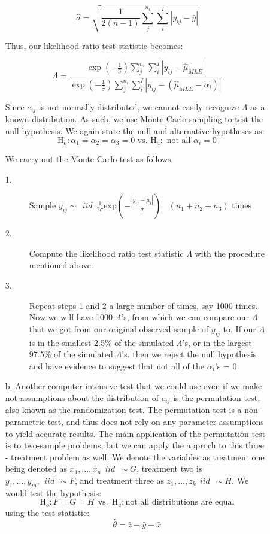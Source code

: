 \documentclass[12pt]{article}
\begin{document}
\begin{description}
\begin{itemize}
\[\hat{\sigma} = \sqrt{\frac{1}{2(n-1)}\sum_j^{n_i}\sum_i^{I} |y_{ij} - \bar{y}|} \]

Thus, our likelihood-ratio test-statistic becomes:

\[\Lambda = \frac{\exp(-\frac{1}{\hat{\sigma}})\sum_j^{n_i}\sum_i^{I}|y_{ij} - \hat{\mu}_{MLE}|}{\exp(-\frac{1}{\hat{\sigma}})\sum_j^{n_i}\sum_i^{I}|y_{ij} - (\hat{\mu}_{MLE}-\alpha_i)|} \]

Since $e_{ij}$ is not normally distributed, we cannot easily recognize $\Lambda$ as a known distribution. As such, we use Monte Carlo sampling to test the null hypothesis. We again state the null and alternative hypotheses as:
\[\text{H}_o: \alpha_1 = \alpha_2 = \alpha_3 = 0 \text{ vs. } \text{H}_a: \text{ not all } \alpha_i = 0\]

We carry out the Monte Carlo test as follows:

\begin{description}
\item[1.] Sample $  y_{ij} \sim \ \ iid \ \ \frac{1}{2\sigma} \mathrm{exp} \left( -\frac{|y_{ij} - \mu_i|}{\sigma}\right) \ \ \ \ (n_1 + n_2 + n_3) \text{ times}$
\item[2.] Compute the likelihood ratio test statistic $\Lambda$ with the procedure mentioned above. 
\item[3.] Repeat steps 1 and 2 a large number of times, say 1000 times.\\

Now we will have 1000 $\Lambda$'s, from which we can compare our $\Lambda$ that we got from our original observed sample of $y_{ij}$ to. If our $\Lambda$ is in the smallest 2.5\% of the simulated $\Lambda$'s, or in the largest  97.5\% of the simulated $\Lambda$'s, then we reject the null hypothesis and have evidence to suggest that not all of the $\alpha_i$'s  = 0. 

\end{description}
\item[b.] Another computer-intensive test that we could use even if we make not assumptions about the distribution of $e_{ij}$ is the permutation test, also known as the randomization test. The permutation test is a non-parametric test, and thus does not rely on any parameter assumptions to yield accurate results. The main application of the permutation test is to two-sample problems, but we can apply the approch to this three - treatment problem as well. We denote the variables as treatment one being denoted as $x_1, \dots, x_n  \ \ iid \ \ \sim G$, treatment two is $y_1, \dots, y_m, \ \ iid \ \ \sim F$, and treatment three as $z_1, \dots, z_k \ \ iid \ \ \sim H$. We would test the hypothesis:
\[\text{H}_o: F = G = H \ \ \text{vs.} \ \ \text{H}_a: \text{not all distributions are equal}\]
using the test statistic:
\[\hat{\theta} = \bar{z} - \bar{y} - \bar{x}\]


\end{itemize}
\end{description}
\end{document}
